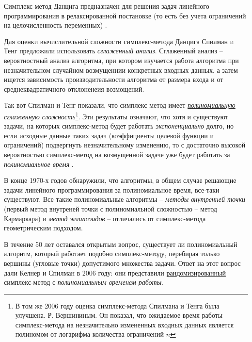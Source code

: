 \documentclass[%
	11pt,
	a4paper,
	utf8,
		]{article}
\begin{document}
Симплекс-метод Данцига предназначен для решения задач линейного программирования в релаксированной постановке (то есть без учета ограничений на целочисленность переменных) \cite[]{achterberg:constr_int_prog}.


Для оценки вычислительной сложности симплекс-метода Данцига Спилман и Тенг предложили использовать \emph{сглаженный анализ}. Сглаженный анализ -- вероятностный анализ алгоритма, при котором изучается работа алгоритма при незначительном случайном возмущеннии конкретных входных данных, а затем ищется зависимость производительности алгоритма от размера входа и от среднеквадратичного отклоненеия возмощений.

Так вот Спилман и Тенг показали, что симплекс-метод имеет \emph{\underline{полиномиальную} сглаженную сложность}\footnote{В том же 2006 году оценка симплекс-метода Спилмана и Тенга была улучшена. Р. Вершининым. Он показал, что ожидаемое время работы симплекс-метода на незначительно измененных входных данных является полиномом от логарифма количества ограничений $ n $}. Эти результаты означают, что хотя и существуют задачи, на которых симплекс-метод будет работать \emph{экспоненциально} долго, но если исходные данные таких задач (коэффициенты целевой функции и ограничений) подвергнуть незначительному изменению, то с достаточно высокой вероятностью симплекс-метод на возмущенной задаче уже будет работать за \emph{полиномиальное время} \cite[]{vorontsova:convex_opt-2021}.

В конце 1970-х годов обнаружили, что алгоритмы, в общем случае решающие задачи линейного программирования за полиномиальное время, все-таки существуют. Все такие полиномиальные алгоритмы -- \emph{методы внутренней точки} (первый метод внутреней точки с полиномиальной сложностью -- метод Кармаркара) и \emph{метод эллипсоидов} -- отличались от симплекс-метода геометрическим подходом.

В течение 50 лет оставался открытым вопрос, существует ли полиномиальный алгоритм, который работает подобно симплекс-методу, перебирая только вершины (угловые точки) допустимого множества задачи. Ответ на этот вопрос дали Келнер и Спилман в 2006 году: они представили \underline{рандомизированный} симплекс-метод с \emph{полиномиальным временем работы}.
\end{document}
